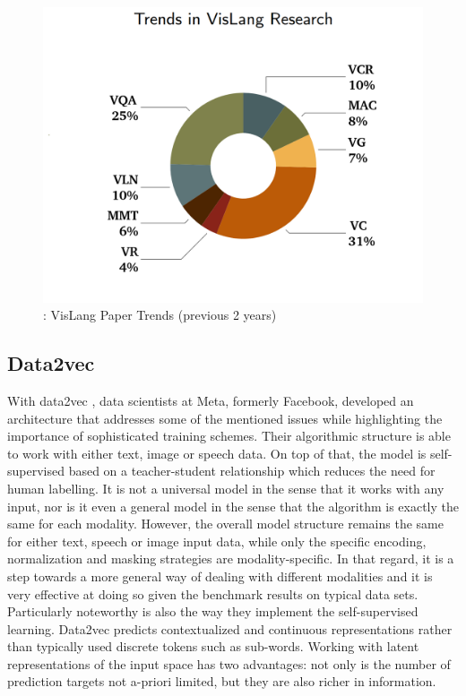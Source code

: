 \documentclass[
]{krantz}
\begin{document}
\begin{figure}

{\centering \includegraphics[width=0.7\linewidth]{figures/05-chapter2/vltasks} 

}

\caption{\citet{uppal2022multimodal}: VisLang Paper Trends (previous 2 years)}\label{fig:vltasks}
\end{figure}



\hypertarget{data2vec}{%
\subsection{Data2vec}\label{data2vec}}

With data2vec \citep{baevski2022data2vec}, data scientists at Meta, formerly Facebook, developed an architecture that addresses some of the mentioned issues while highlighting the importance of sophisticated training schemes. Their algorithmic structure is able to work with either text, image or speech data. On top of that, the model is self-supervised based on a teacher-student relationship which reduces the need for human labelling. It is not a universal model in the sense that it works with any input, nor is it even a general model in the sense that the algorithm is exactly the same for each modality. However, the overall model structure remains the same for either text, speech or image input data, while only the specific encoding, normalization and masking strategies are modality-specific. In that regard, it is a step towards a more general way of dealing with different modalities and it is very effective at doing so given the benchmark results on typical data sets. Particularly noteworthy is also the way they implement the self-supervised learning. Data2vec predicts contextualized and continuous representations rather than typically used discrete tokens such as sub-words. Working with latent representations of the input space has two advantages: not only is the number of prediction targets not a-priori limited, but they are also richer in information.
\end{document}
